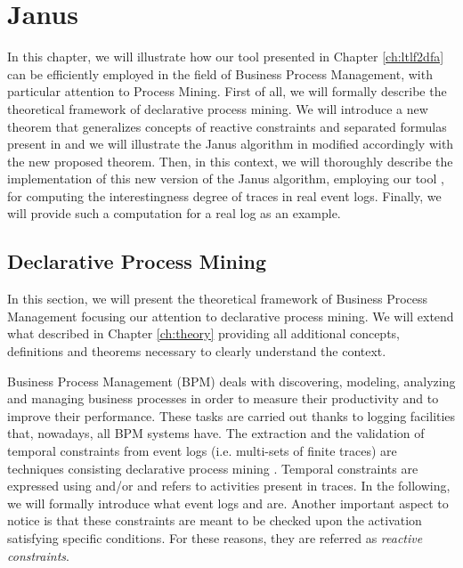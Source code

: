 \chapter{Janus}
In this chapter, we will illustrate how our tool \LTLfToDFA presented in Chapter \ref{ch:ltlf2dfa} can be efficiently employed in the field of Business Process Management, with particular attention to Process Mining. First of all, we will formally describe the theoretical framework of declarative process mining. We will introduce a new theorem that generalizes concepts of reactive constraints and separated formulas present in \citep{cecconi2018interestingness} and we will illustrate the Janus algorithm in \citep{cecconi2018interestingness} modified accordingly with the new proposed theorem. Then, in this context, we will thoroughly describe the implementation of this new version of the Janus algorithm, employing our tool \LTLfToDFA, for computing the interestingness degree of traces in real event logs. Finally, we will provide such a computation for a real log as an example. 
\section{Declarative Process Mining}
In this section, we will present the theoretical framework of Business Process Management focusing our attention to declarative process mining. We will extend what described in Chapter \ref{ch:theory} providing all additional concepts, definitions and theorems necessary to clearly understand the context.

Business Process Management (BPM) deals with discovering, modeling, analyzing and managing business processes in order to measure their productivity and to improve their performance. These tasks are carried out thanks to logging facilities that, nowadays, all BPM systems have. The extraction and the validation of temporal constraints from event logs (i.e. multi-sets of finite traces) are techniques consisting declarative process mining \citep{montali2010declarative}. Temporal constraints are expressed using \LTLf and/or \PLTL and refers to activities present in traces. In the following, we will formally introduce what event logs and \declare \citep{pesic2008constraint} are. Another important aspect to notice is that these constraints are meant to be checked upon the activation satisfying specific conditions. For these reasons, they are referred as \emph{reactive constraints}.
